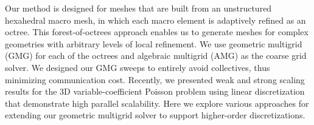  


 Our method is designed for meshes that are built from an unstructured
hexahedral macro mesh, in which each macro element is adaptively
refined as an octree. This forest-of-octrees approach enables us to
generate meshes for complex geometries with arbitrary levels of local
refinement. We use geometric multigrid (GMG) for each of the octrees
and algebraic multigrid (AMG) as the coarse grid solver. We designed
our GMG sweeps to entirely avoid collectives, thus minimizing
communication cost. Recently, we presented weak and strong scaling
results for the 3D variable-coefficient Poisson problem using linear
discretization that demonstrate high parallel scalability. Here we
explore various approaches for extending our geometric multigrid
solver to support higher-order discretizations.





